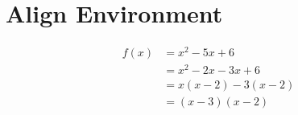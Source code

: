 \documentclass{article}
\begin{document}
	
\section{Align Environment}

\begin{align}
f(x) & = x^2 - 5x + 6 \nonumber \\ 
 		& = x^2 - 2x - 3x + 6 \nonumber \\
 		& = x(x-2) - 3 (x - 2)  \nonumber\\
 		& = (x-3) (x-2)
\end{align}
\end{document}
